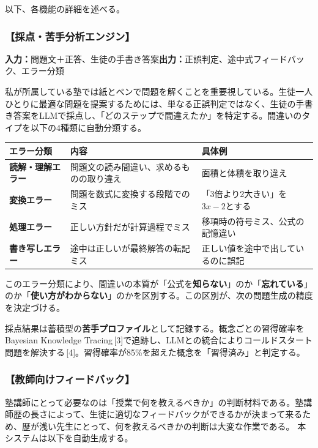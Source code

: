 \documentclass[paper=a4,fontsize=10.5bp,jafontsize=10.5bp,twocolumn]{jlreq}
\begin{document}
以下、各機能の詳細を述べる。

\subsubsection{【採点・苦手分析エンジン】}

\noindent\textbf{入力：}問題文＋正答、生徒の手書き答案\quad\textbf{出力：}正誤判定、途中式フィードバック、エラー分類

私が所属している塾では紙とペンで問題を解くことを重要視している。生徒一人ひとりに最適な問題を提案するためには、単なる正誤判定ではなく、生徒の手書き答案をLLMで採点し、「どのステップで間違えたか」を特定する。間違いのタイプを以下の4種類に自動分類する。


\begin{footnotesize}\noindent
\begin{tabularx}{\linewidth}{>{\bfseries}l X X}
\toprule
エラー分類 & 内容 & 具体例 \\
\midrule
読解・理解エラー & 問題文の読み間違い、求めるものの取り違え & 面積と体積を取り違え \\
変換エラー & 問題を数式に変換する段階でのミス & 「3倍より2大きい」を$3x-2$とする \\
処理エラー & 正しい方針だが計算過程でミス & 移項時の符号ミス、公式の記憶違い \\
書き写しエラー & 途中は正しいが最終解答の転記ミス & 正しい値を途中で出しているのに誤記 \\
\bottomrule
\end{tabularx}
\end{footnotesize}


このエラー分類により、間違いの本質が「公式を\textbf{知らない}」のか「\textbf{忘れている}」のか「\textbf{使い方がわからない}」のかを区別する。この区別が、次の問題生成の精度を決定づける。

採点結果は蓄積型の\textbf{苦手プロファイル}として記録する。概念ごとの習得確率をBayesian Knowledge Tracing\,[3]で追跡し、LLMとの統合によりコールドスタート問題を解決する\,[4]。習得確率が85\%を超えた概念を「習得済み」と判定する。

\subsubsection{【教師向けフィードバック】}

塾講師にとって必要なのは「授業で何を教えるべきか」の判断材料である。塾講師歴の長さによって、生徒に適切なフィードバックができるかが決まって来るため、歴が浅い先生にとって、何を教えるべきかの判断は大変な作業である。
本システムは以下を自動生成する。
\end{document}
